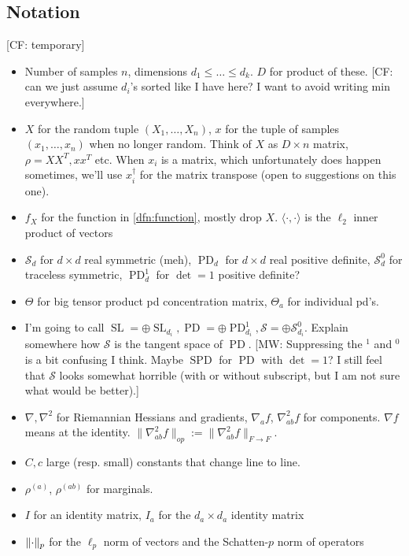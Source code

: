 \documentclass{article}
\DeclarePairedDelimiter{\norm}{\lVert}{\rVert}
\renewcommand{\vec}{\bm}
\newcommand\SL{\operatorname{SL}}
\newcommand\PD{\operatorname{PD}}
\newcommand\Sym{\mathcal{S}}
\newcommand\samp{x}
\newcommand\rv{X}
\newcommand{\CF}[1]{{\color{purple}[CF: #1]}}
\newcommand{\MW}[1]{{\color{red}[MW: #1]}}
\begin{document}
\subsection{Notation}
\CF{temporary}
\begin{itemize}
\item Number of samples $n$, dimensions $d_1\leq \dots \leq d_k$. $D$ for product of these. \CF{can we just assume $d_i$'s sorted like I have here? I want to avoid writing min everywhere.}

\item $\rv$ for the random tuple $(\rv_1, \dots, \rv_n)$, $x$ for the tuple of samples $(x_1, \dots, x_n)$ when no longer random. Think of $\rv$ as $D \times n$ matrix, $\rho = \rv\rv^T,xx^T$ etc. When $x_i$ is a matrix, which unfortunately does happen sometimes, we'll use $x_i^\dagger$ for the matrix transpose (open to suggestions on this one).
\item $f_{\rv}$ for the function in \cref{dfn:function}, mostly drop $\rv$. $\langle \cdot, \cdot \rangle$ is the $\ell_2$ inner product of vectors

\item $\Sym_d$ for $d \times d$ real symmetric (meh), $\PD_d$ for $d \times d$ real positive definite, $\Sym_d^0$ for traceless symmetric, $\PD_d^1$ for $\det=1$ positive definite? 
\item $\Theta$ for big tensor product pd concentration matrix, $\Theta_a$ for individual pd's.
\item I'm going to call $\SL = \oplus \SL_{d_i}, \PD = \oplus \PD_{d_i}^1, \Sym = \oplus \Sym_{d_i}^0$. Explain somewhere how $\Sym$ is the tangent space of $\PD$. \MW{Suppressing the $^1$ and $^0$ is a bit confusing I think. Maybe $\operatorname{SPD}$ for $\PD$ with $\det=1$? I still feel that $\Sym$ looks somewhat horrible (with or without subscript, but I am not sure what would be better).}

\item $\nabla, \nabla^2$ for Riemannian Hessians and gradients, $\nabla_a f$, $\nabla^2_{ab} f$ for components. $\nabla f$ means at the identity. $\|\nabla^2_{ab}f\|_{op}:=\|\nabla^2_{ab}f\|_{F\to F}$.
\item $C, c$ large (resp. small) constants that change line to line.
\item $\rho^{(a)}$, $\rho^{(ab)}$ for marginals.
\item $I$ for an identity matrix, $I_a$ for the $d_a \times d_a$ identity matrix
\item $\norm{\cdot}_p$ for the $\ell_p$ norm of vectors and the Schatten-$p$ norm of operators
\end{itemize}
\end{document}
